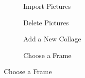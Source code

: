 \documentclass{tei2013}
\begin{document}
\begin{figure}[htb]
\centering
\begin{subfigure}[b]{.24\textwidth}
\centering
{}
\caption{Import Pictures}
\label{fig:prototype1-1}
\end{subfigure}
\begin{subfigure}[b]{.24\textwidth}
\centering
{}
\caption{Delete Pictures}
\label{fig:prototype1-2}
\end{subfigure}
\begin{subfigure}[b]{.24\textwidth}
\centering
{}
\caption{Add a New Collage}
\label{fig:prototype1-3}
\end{subfigure}
\begin{subfigure}[b]{.24\textwidth}
\centering
{}
\caption{Choose a Frame}
\label{fig:prototype1-4}

\end{subfigure}
\end{figure}
\end{document}
